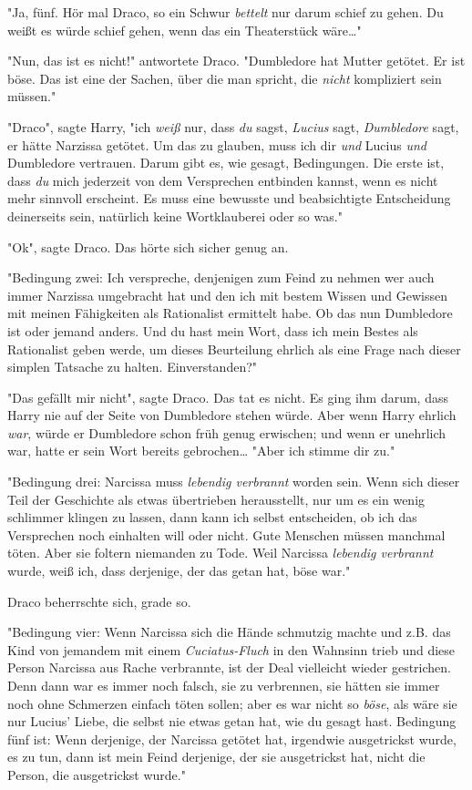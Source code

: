 {"Ja, fünf. Hör mal Draco, so ein Schwur \emph{bettelt} nur darum schief zu gehen. Du weißt es würde schief gehen, wenn das ein Theaterstück wäre…"

"Nun, das ist es nicht!" antwortete Draco. "Dumbledore hat Mutter getötet. Er ist böse. Das ist eine der Sachen, über die man spricht, die \emph{nicht} kompliziert sein müssen."

"Draco", sagte Harry, "ich \emph{weiß} nur, dass \emph{du} sagst, \emph{Lucius} sagt, \emph{Dumbledore} sagt, er hätte Narzissa getötet. Um das zu glauben, muss ich dir \emph{und} Lucius \emph{und} Dumbledore vertrauen. Darum gibt es, wie gesagt, Bedingungen. Die erste ist, dass \emph{du} mich jederzeit von dem Versprechen entbinden kannst, wenn es nicht mehr sinnvoll erscheint. Es muss eine bewusste und beabsichtigte Entscheidung deinerseits sein, natürlich keine Wortklauberei oder so was."

"Ok", sagte Draco. Das hörte sich sicher genug an.

"Bedingung zwei: Ich verspreche, denjenigen zum Feind zu nehmen wer auch immer Narzissa umgebracht hat und den ich mit bestem Wissen und Gewissen mit meinen Fähigkeiten als Rationalist ermittelt habe. Ob das nun Dumbledore ist oder jemand anders. Und du hast mein Wort, dass ich mein Bestes als Rationalist geben werde, um dieses Beurteilung ehrlich als eine Frage nach dieser simplen Tatsache zu halten. Einverstanden?"

"Das gefällt mir nicht", sagte Draco. Das tat es nicht. Es ging ihm darum, dass Harry nie auf der Seite von Dumbledore stehen würde. Aber wenn Harry ehrlich \emph{war}, würde er Dumbledore schon früh genug erwischen; und wenn er unehrlich war, hatte er sein Wort bereits gebrochen… "Aber ich stimme dir zu."

"Bedingung drei: Narcissa muss \emph{lebendig verbrannt} worden sein. Wenn sich dieser Teil der Geschichte als etwas übertrieben herausstellt, nur um es ein wenig schlimmer klingen zu lassen, dann kann ich selbst entscheiden, ob ich das Versprechen noch einhalten will oder nicht. Gute Menschen müssen manchmal töten. Aber sie foltern niemanden zu Tode. Weil Narcissa \emph{lebendig verbrannt} wurde, weiß ich, dass derjenige, der das getan hat, böse war."

Draco beherrschte sich, grade so.

"Bedingung vier: Wenn Narcissa sich die Hände schmutzig machte und z.B. das Kind von jemandem mit einem \emph{Cuciatus-Fluch} in den Wahnsinn trieb und diese Person Narcissa aus Rache verbrannte, ist der Deal vielleicht wieder gestrichen. Denn dann war es immer noch falsch, sie zu verbrennen, sie hätten sie immer noch ohne Schmerzen einfach töten sollen; aber es war nicht so \emph{böse}, als wäre sie nur Lucius' Liebe, die selbst nie etwas getan hat, wie du gesagt hast. Bedingung fünf ist: Wenn derjenige, der Narcissa getötet hat, irgendwie ausgetrickst wurde, es zu tun, dann ist mein Feind derjenige, der sie ausgetrickst hat, nicht die Person, die ausgetrickst wurde."

}
